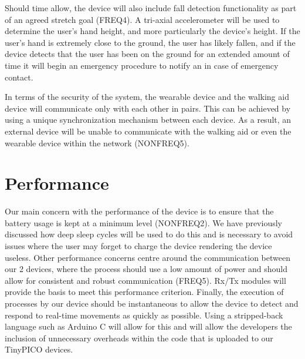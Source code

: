         Should time allow, the device will also include fall detection functionality as part of an agreed stretch goal
        (FREQ4). A tri-axial accelerometer will be used to determine the user's hand height, and more particularly the
        device's height. If the user's hand is extremely close to the ground, the user has likely fallen, and
        if the device detects that the user has been on the ground for an extended amount of time it will begin an
        emergency procedure to notify an in case of emergency contact.

        In terms of the security of the system, the wearable device and the walking aid device will communicate only
        with each other in pairs. This can be achieved by using a unique synchronization mechanism between each device.
        As a result, an external device will be unable to communicate with the walking aid or even the wearable device
        within the network (NONFREQ5).

    \section{Performance}

        Our main concern with the performance of the device is to ensure that the battery usage is kept at a minimum
        level (NONFREQ2). We have previously discussed how deep sleep cycles will be used to do this and is necessary to
        avoid issues where the user may forget to charge the device rendering the device useless. Other performance
        concerns centre around the communication between our 2 devices, where the process should use a low amount of
        power and should allow for consistent and robust communication (FREQ5). Rx/Tx modules will provide the basis to
        meet this performance criterion. Finally, the execution of processes by our device should be instantaneous to
        allow the device to detect and respond to real-time movements as quickly as possible. Using a stripped-back
        language such as Arduino C will allow for this and will allow the developers the inclusion of unnecessary
        overheads within the code that is uploaded to our TinyPICO devices.
